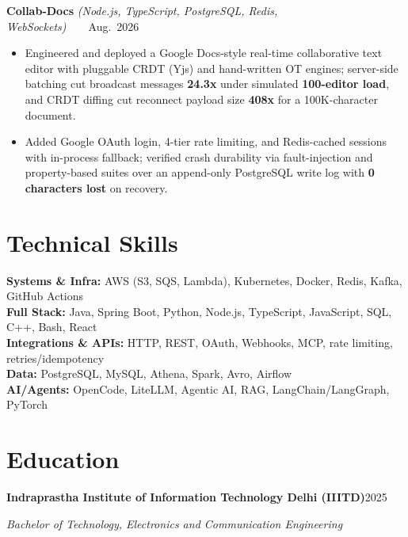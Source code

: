 \documentclass[10pt,letterpaper]{article}
\newcommand{\resumeHeading}[4]{%
  \par\noindent\textbf{#1}\hfill\mbox{#2}\par
  \noindent\textit{#3}\hfill\mbox{\textit{#4}}\par
}
\newcommand{\projectHeading}[3]{%
  \par\noindent\textbf{#1} \textit{(#2)}\hfill\mbox{#3}\par
}
\begin{document}
\projectHeading{Collab-Docs}{Node.js, TypeScript, PostgreSQL, Redis, WebSockets}{\scriptsize\href{https://github.com/dreddak47/collab-docs}{\faGithub}\ \textbar\ \href{https://collab-client-kvn5.onrender.com/}{\faExternalLink}\ \textbar\ \normalsize Aug. 2026}
\begin{itemize}
  \item Engineered and deployed a Google Docs-style real-time collaborative text editor with pluggable CRDT (Yjs) and hand-written OT engines; server-side batching cut broadcast messages \textbf{24.3x} under simulated \textbf{100-editor load}, and CRDT diffing cut reconnect payload size \textbf{408x} for a 100K-character document.
  \item Added Google OAuth login, 4-tier rate limiting, and Redis-cached sessions with in-process fallback; verified crash durability via fault-injection and property-based suites over an append-only PostgreSQL write log with \textbf{0 characters lost} on recovery.
\end{itemize}

\section{Technical Skills}
\textbf{Systems \& Infra:} AWS (S3, SQS, Lambda), Kubernetes, Docker, Redis, Kafka, GitHub Actions \\[-1pt]
\textbf{Full Stack:} Java, Spring Boot, Python, Node.js, TypeScript, JavaScript, SQL, C++, Bash, React \\[-1pt]
\textbf{Integrations \& APIs:} HTTP, REST, OAuth, Webhooks, MCP, rate limiting, retries/idempotency \\[-1pt]
\textbf{Data:} PostgreSQL, MySQL, Athena, Spark, Avro, Airflow \\[-1pt]
\textbf{AI/Agents:} OpenCode, LiteLLM, Agentic AI, RAG, LangChain/LangGraph, PyTorch \\[-1pt]

\section{Education}
\resumeHeading
  {Indraprastha Institute of Information Technology Delhi (IIITD)}
  {2025}
  {Bachelor of Technology, Electronics and Communication Engineering}
  {}
\end{document}
